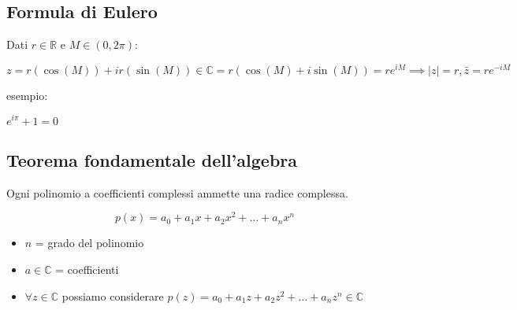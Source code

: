 \documentclass{article}
\begin{document}
\subsection{Formula di Eulero}

Dati $r \in \mathbb{R}$ e $M \in (0, 2\pi)$:

$$
z = r(\cos(M)) + i r(\sin(M)) \in \mathbb{C} = r(\cos(M) + i\sin(M)) = re^{iM} \implies |z| = r, \bar{z} = re^{-iM}
$$

\noindent
esempio:

\begin{description}
    \item $e^{i\pi} + 1 = 0$
\end{description}

\subsection{Teorema fondamentale dell'algebra}

Ogni polinomio a coefficienti complessi ammette una radice complessa.

$$
p(x) = a_0 + a_1 x + a_2 x^2 + \dots + a_n x^n
$$

\begin{itemize}
    \item $n$ = grado del polinomio
    \item $a \in \mathbb{C}$ = coefficienti
    \item $\forall z \in \mathbb{C}$ possiamo considerare $p(z) = a_0 + a_1 z + a_2 z^2 + \dots + a_n z^n \in \mathbb{C}$
\end{itemize}
\end{document}

